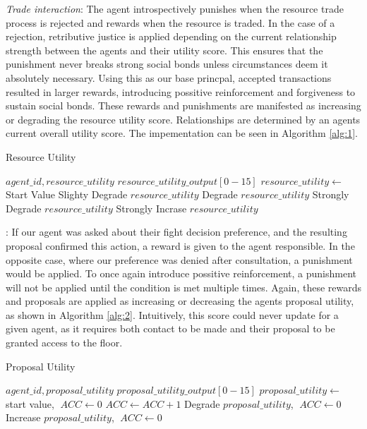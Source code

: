 \textit{Trade interaction}: The agent introspectively punishes when the resource trade process is rejected and rewards when the resource is traded. In the case of a rejection, retributive justice is applied depending on the current relationship strength between the agents and their utility score. This ensures that the punishment never breaks strong social bonds unless circumstances deem it absolutely necessary. Using this as our base princpal, accepted transactions resulted in larger rewards, introducing possitive reinforcement and forgiveness to sustain social bonds. These rewards and punishments are manifested as increasing or degrading the resource utility score. Relationships are determined by an agents current overall utility score. The impementation can be seen in Algorithm \ref{alg:1}. 

\begin{algorithm}[htb]
    \caption{Resource Utility}\label{alg:1}
    \begin{algorithmic} 
    \scriptsize
    \Require $agent\_id, resource\_utility$
    \Ensure $resource\_utility\_output[0-15]$
    \State $resource\_utility \leftarrow $ Start Value
    \EndIf
    \State Slighty Degrade $resource\_utility$ 
    \EndIf
    \State Degrade $resource\_utility$
    \Else
    \State Strongly Degrade $resource\_utility$
    \EndIf
    \EndIf
    \State Strongly Incrase $resource\_utility$ 
    \EndIf
    \end{algorithmic}
    \end{algorithm}



: If our agent was asked about their fight decision preference, and the resulting proposal confirmed this action, a reward is given to the agent responsible. In the opposite case, where our preference was denied after consultation, a punishment would be applied. To once again introduce possitive reinforcement, a punishment will not be applied until the condition is met multiple times. Again, these rewards and proposals are applied as increasing or decreasing the agents proposal utility, as shown in Algorithm \ref{alg:2}. Intuitively, this score could never update for a given agent, as it requires both contact to be made and their proposal to be granted access to the floor. 

\begin{algorithm}
\caption{Proposal Utility}\label{alg:2}
\begin{algorithmic} 
\scriptsize
\Require $agent\_id, proposal\_utility$
\Ensure $proposal\_utility\_output[0-15]$
\State $proposal\_utility \leftarrow$ start value, $\; ACC \leftarrow 0$
\EndIf
{}
\State $ACC \leftarrow ACC+1$
\State Degrade $proposal\_utility$, $\; ACC \leftarrow 0$
\EndIf
\EndIf
{}
\State Increase $proposal\_utility$, $\; ACC \leftarrow 0$
\EndIf
\end{algorithmic}
\end{algorithm}


